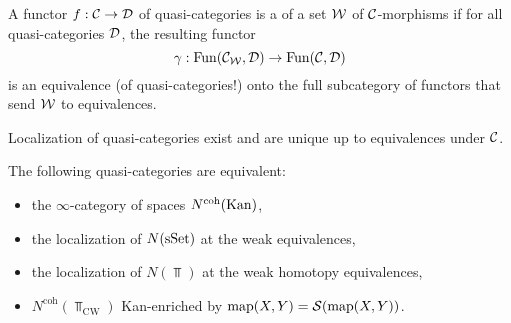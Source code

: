A functor $f:\mathcal{C}\to\mathcal{D}$ of quasi-categories is a  of a set $\mathcal{W}$ of $\mathcal{C}$-morphisms if for all quasi-categories $\mathcal{D}$, the resulting functor
\[\gamma:\operatorname{Fun}(\mathcal{C}_{\mathcal{W}},\mathcal{D})\to\operatorname{Fun}(\mathcal{C},\mathcal{D})\]
is an equivalence (of quasi-categories!) onto the full subcategory of functors that send $\mathcal{W}$ to equivalences. 

Localization of quasi-categories exist and are unique up to equivalences under $\mathcal{C}$.

\begin{theorem}
The following quasi-categories are equivalent:
\begin{itemize}[label={-}]
    \item the $\infty$-category of spaces $N^\text{coh}({\mathrm{Kan}})$,
    \item the localization of $N({\mathrm{sSet}})$ at the weak equivalences,
    \item the localization of $N(\Top)$ at the weak homotopy equivalences,
    \item $N^\text{coh}(\Top_\text{CW})$ Kan-enriched by $\operatorname{map}(X,Y)=\mathcal{S}(\operatorname{map}(X,Y))$.
\end{itemize}
\end{theorem}
